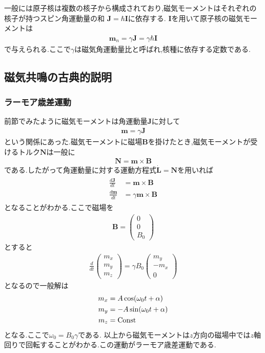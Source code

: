 一般には原子核は複数の核子から構成されており,磁気モーメントはそれぞれの核子が持つスピン角運動量の和
${\bm J}=\hbar{\bm I}$に依存する.
${\bm I}$を用いて原子核の磁気モーメントは
\begin{align}
  {\bm m}_n=\gamma{\bm J}=\gamma\hbar{\bm I}
\end{align}
で与えられる.ここで$\gamma$は磁気角運動量比と呼ばれ,核種に依存する定数である.
\subsection{磁気共鳴の古典的説明}
\subsubsection{ラーモア歳差運動}
前節でみたように磁気モーメントは角運動量${\bm J}$に対して
\begin{align}
  {\bm m}=\gamma{\bm J}
\end{align}
という関係にあった.磁気モーメントに磁場${\bm B}$を掛けたとき,磁気モーメントが受けるトルク${\bm N}$は一般に
\begin{align}
  {\bm N}={\bm m}\times {\bm B}
\end{align}
である.したがって角運動量に対する運動方程式$\dot{{\bm L}}={\bm N}$を用いれば
\begin{align}
  \begin{split}
    \frac{d{\bm J}}{dt}&={\bm m}\times {\bm B}\\
    \frac{d{\bm m}}{dt}&=\gamma{\bm m}\times {\bm B}
  \end{split}
\end{align}
となることがわかる.ここで磁場を
\begin{align}
  {\bm B}=\left(\begin{array}{c}
    0\\0\\B_0
  \end{array}\right)
\end{align}
とすると
\begin{align}
  \frac{d}{dt}\left(\begin{array}{c}
    m_x\\m_y\\m_z
  \end{array}\right)=
  \gamma B_0\left(\begin{array}{c}
    m_y\\-m_x\\0
  \end{array}\right)
\end{align}
となるので一般解は
\begin{align}
  \begin{split}
    m_x&=A\cos(\omega_0 t+\alpha)\\
    m_y&=-A\sin(\omega_0 t+\alpha)\\
    m_z&={\rm Const}
  \end{split}
\end{align}
となる.ここで$\omega_0=B_0\gamma$である.
以上から磁気モーメントは$z$方向の磁場中では$z$軸回りで回転することがわかる.この運動がラーモア歳差運動である.
